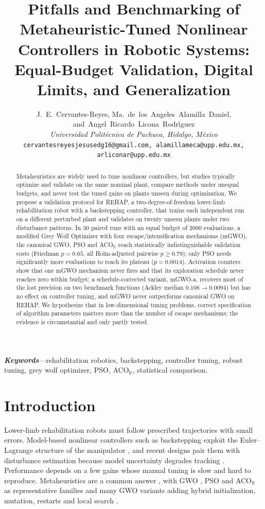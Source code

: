 \documentclass[10pt,journal,compsoc]{IEEEtran}
\title{Pitfalls and Benchmarking of Metaheuristic-Tuned Nonlinear Controllers in Robotic Systems: Equal-Budget Validation, Digital Limits, and Generalization}
\author{J.~E.~Cervantes-Reyes, Ma.~de~los~Angeles~Alamilla~Daniel, and~Angel~Ricardo~Licona~Rodr{\'\i}guez\\
\textit{Universidad Polit\'ecnica de Pachuca, Hidalgo, M\'exico}\\
\texttt{cervantesreyesjesusedg16@gmail.com, alamillameca@upp.edu.mx, arliconar@upp.edu.mx}}
\newcommand{\mgwo}{mGWO}
\newcommand{\mgwoa}{mGWO-a}
\newcommand{\acor}{ACO$_\mathbb{R}$}
\newcommand{\rehap}{REHAP}
\begin{document}
\maketitle

\begin{abstract}
Metaheuristics are widely used to tune nonlinear controllers, but studies typically optimize and validate on the same nominal plant, compare methods under unequal budgets, and never test the tuned gains on plants unseen during optimization. We propose a validation protocol for \rehap{}, a two-degree-of-freedom lower-limb rehabilitation robot with a backstepping controller, that trains each independent run on a different perturbed plant and validates on twenty unseen plants under two disturbance patterns. In 30 paired runs with an equal budget of 2000 evaluations, a modified Grey Wolf Optimizer with four escape/intensification mechanisms (\mgwo{}), the canonical GWO, PSO and \acor{} reach statistically indistinguishable validation costs (Friedman $p=0.65$, all Holm-adjusted pairwise $p\ge0.79$); only PSO needs significantly more evaluations to reach its plateau ($p=0.0014$). Activation counters show that one \mgwo{} mechanism never fires and that its exploration schedule never reaches zero within budget; a schedule-corrected variant, \mgwoa{}, recovers most of the lost precision on two benchmark functions (Ackley median $0.108\to0.0094$) but has no effect on controller tuning, and \mgwo{} never outperforms canonical GWO on \rehap{}. We hypothesize that in low-dimensional tuning problems, correct specification of algorithm parameters matters more than the number of escape mechanisms; the evidence is circumstantial and only partly tested.
\end{abstract}

\noindent\textbf{\textit{Keywords}}---rehabilitation robotics, backstepping, controller tuning, robust tuning, grey wolf optimizer, PSO, ACO$_\mathbb{R}$, statistical comparison.

\section{Introduction}
Lower-limb rehabilitation robots must follow prescribed trajectories with small errors. Model-based nonlinear controllers such as backstepping \cite{krstic1995,khalil2002} exploit the Euler--Lagrange structure of the manipulator \cite{spong2006}, and recent designs pair them with disturbance estimation because model uncertainty degrades tracking \cite{peng2022,ren2025}. Performance depends on a few gains whose manual tuning is slow and hard to reproduce. Metaheuristics are a common answer \cite{azeez2023,dai2023}, with GWO \cite{mirjalili2014}, PSO \cite{kennedy1995,shi1998,clerc2002} and \acor{} \cite{socha2008,dorigo1997} as representative families and many GWO variants adding hybrid initialization, mutation, restarts and local search \cite{crepinsek2013,neri2012,blum2003}.
\end{document}
